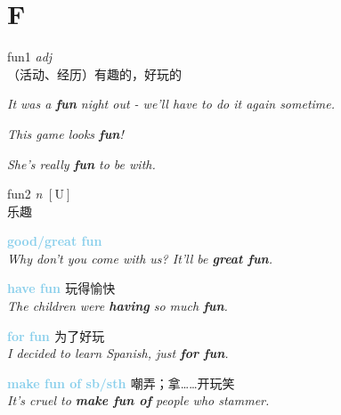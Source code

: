 \section{F}
\item[] {
    \lettrine{fun}{1}  
    \textit{adj} \\
    （活动、经历）有趣的，好玩的

    \textit{It was a \textbf{fun} night out - we'll have to do it again sometime.}

    \textit{This game looks \textbf{fun}!}

    \textit{She's really \textbf{fun} to be with.}
  
} 
\item[] {
    \lettrine{fun}{2}  
    \textit{n} 
    $\mathrm{[U]}$ \\
    乐趣

    \textbf {
        \textcolor{SkyBlue} {
            good/great fun
        }
    } \\
    \textit{Why don't you come with us? It'll be \textbf{great fun}.}

    \textbf {
        \textcolor{SkyBlue} {
            have fun
        }
    } 
    玩得愉快 \\
    \textit{The children were \textbf{having} so much \textbf{fun}.}

    \textbf {
        \textcolor{SkyBlue} {
            for fun
        }
    }  
    为了好玩 \\
    \textit{I decided to learn Spanish, just \textbf{for fun}.}
    
    \textbf {
        \textcolor{SkyBlue} {
            make \textprimstress fun of sb/sth
        }
    }  
    嘲弄；拿……开玩笑 \\
    \textit{It's cruel to \textbf{make fun of} people who stammer.}
} 
